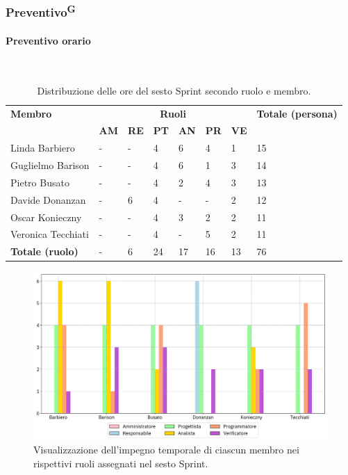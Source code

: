\documentclass[8pt]{article}
\newcommand{\glossterm}[1]{#1\textsuperscript{G}} %
\newcommand{\subsubsubsection}[1]{\paragraph{#1}\mbox{}\\}
\begin{document}
\subsubsection{\glossterm{Preventivo}}
\subsubsubsection{Preventivo orario}
\begin{table}[ht!]
	\centering
	\begin{tabular}{p{4cm} p{1cm} p{1cm} p{1cm} p{1cm} p{1cm} p{1cm} p{3cm}}
		\toprule
        \textbf{Membro} & \multicolumn{6}{c}{\textbf{Ruoli}} & \textbf{Totale (persona)}\\
		& \textbf{AM} & \textbf{RE} & \textbf{PT} & \textbf{AN} & \textbf{PR} & \textbf{VE}\\
		\midrule
        Linda Barbiero          & -     & -     & 4     & 6     & 4     & 1     & 15 \\
        Guglielmo Barison       & -     & -     & 4     & 6     & 1     & 3     & 14 \\
        Pietro Busato           & -     & -     & 4     & 2     & 4     & 3     & 13 \\
        Davide Donanzan         & -     & 6     & 4     & -     & -     & 2     & 12 \\
        Oscar Konieczny         & -     & -     & 4     & 3     & 2     & 2     & 11 \\
        Veronica Tecchiati      & -     & -     & 4     & -     & 5     & 2     & 11 \\
        \midrule
        \textbf{Totale (ruolo)} & -     & 6     & 24    & 17    & 16    & 13    & 76 \\
	\bottomrule
	\end{tabular}
	\caption{Distribuzione delle ore del sesto Sprint secondo ruolo e membro.}
	\label{table:Distribuzione delle ore del sesto Sprint secondo ruolo e membro}
\end{table}
\begin{figure}[ht!]
    \centering
    \includegraphics[width=15cm]{./images_pdp/istogramma_periodo_6.png}
    \caption{Visualizzazione dell'impegno temporale di ciascun membro nei rispettivi ruoli assegnati
    nel sesto Sprint.}
    \label{figure:Visualizzazione dell'impegno temporale di ciascun membro nei rispettivi ruoli
    assegnati nel sesto Sprint}
\end{figure}
\end{document}
